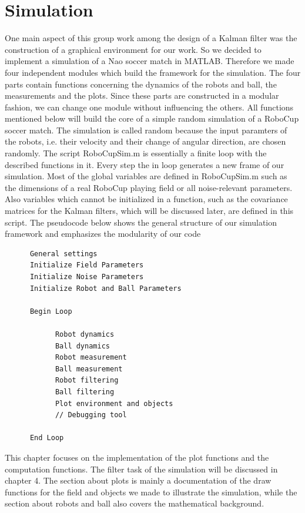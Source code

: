 \chapter{Simulation}

One main aspect of this group work among the design of a Kalman filter was the construction of a graphical environment for our work. So we decided to implement a simulation of a Nao soccer match in MATLAB. Therefore we made four independent modules which build the framework for the simulation. The four parts contain functions concerning the dynamics of the robots and ball, the measurements and the plots. Since these parts are constructed in a modular fashion, we can change one module without influencing the others. All functions mentioned below will build the core of a simple random simulation of a RoboCup soccer match. The simulation is called random because the input paramters of the robots, i.e. their velocity and their change of angular direction, are chosen randomly. The script {\selectfont RoboCupSim.m} is essentially a finite loop with the described functions in it. Every step the in loop generates a new frame of our simulation. Most of the global variables are defined in {\selectfont RoboCupSim.m} such as the dimensions of a real RoboCup playing field or all noise-relevant parameters. Also variables which cannot be initialized in a function, such as the covariance matrices for the Kalman filters, which will be discussed later, are defined in this script. The pseudocode below shows the general structure of our simulation framework and emphasizes the modularity of our code

\begin{verbatim}
      General settings
      Initialize Field Parameters
      Initialize Noise Parameters
      Initialize Robot and Ball Parameters

      Begin Loop
	
            Robot dynamics
            Ball dynamics
            Robot measurement
            Ball measurement
            Robot filtering
            Ball filtering
            Plot environment and objects
            // Debugging tool
	
      End Loop
\end{verbatim}

This chapter focuses on the implementation of the plot functions and the computation functions. The filter task of the simulation will be discussed in chapter 4.
The section about plots is mainly a documentation of the draw functions for the field and objects we made to illustrate the simulation, while the section about robots and ball also covers the mathematical background.

